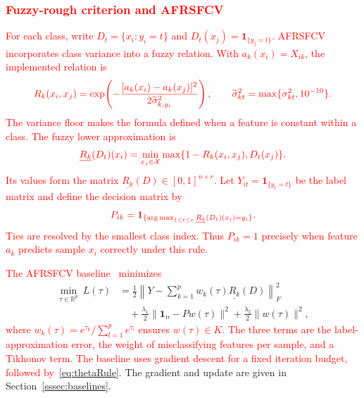\documentclass[]{interact}
\theoremstyle{plain}
\theoremstyle{definition}
\theoremstyle{remark}
\newcommand{\R}{\mathbb{R}}
\DeclareMathOperator*{\argmax}{arg\,max}
\begin{document}
\subsubsection{\textcolor{red}{Fuzzy-rough criterion and AFRSFCV}}\label{ssec:afrsfcv}\label{sssec:afrsfcv-inputs}\label{sssec:afrsfcv-model}
\leavevmode\textcolor{red}{For each class, write $D_t=\{x_i:y_i=t\}$ and $D_t(x_j)=\mathbf1_{\{y_j=t\}}$. AFRSFCV incorporates class variance into a fuzzy relation. With $a_k(x_i)=X_{ik}$, the implemented relation is}
\begin{equation}\label{eq:simRel}\textcolor{red}{
R_k(x_i,x_j)=\exp\!\left(-\frac{[a_k(x_i)-a_k(x_j)]^2}{2\widetilde\sigma_{k,y_i}^2}\right),
\qquad \widetilde\sigma_{kt}^2=\max\{\sigma_{kt}^2,10^{-10}\}.
}\end{equation}
\leavevmode\textcolor{red}{The variance floor makes the formula defined when a feature is constant within a class. The fuzzy lower approximation is}
\begin{equation}\label{eq:lower}\textcolor{red}{
\underline{R_k}(D_t)(x_i)=\min_{x_j\in\mathcal{X}}\max\{1-R_k(x_i,x_j),D_t(x_j)\}.
}\end{equation}
\leavevmode\textcolor{red}{Its values form the matrix $\underline{R_k}(D)\in[0,1]^{n\times r}$. Let $Y_{it}=\mathbf1_{\{y_i=t\}}$ be the label matrix and define the decision matrix by}
\begin{equation}\label{eq:Pmat}\textcolor{red}{
P_{ik}=\mathbf1_{\{\argmax_{1\le t\le r}\underline{R_k}(D_t)(x_i)=y_i\}}.
}\end{equation}
\leavevmode\textcolor{red}{Ties are resolved by the smallest class index. Thus $P_{ik}=1$ precisely when feature $a_k$ predicts sample $x_i$ correctly under this rule.}

\leavevmode\textcolor{red}{The AFRSFCV baseline~\citep{wang2026afrsfcv} minimizes}
\begin{equation}\label{eq:afrsfcvLoss}
\begin{split}
\min_{\tau\in\R^p}\ L(\tau)
&=\frac12\left\|Y-\sum_{k=1}^{p}w_k(\tau)\underline{R_k}(D)\right\|_F^2\\
&\quad+\frac{\lambda_1}{2}\|\mathbf1_n-Pw(\tau)\|^2+\frac{\lambda_2}{2}\|w(\tau)\|^2,
\end{split}
\end{equation}
\leavevmode\textcolor{red}{where $w_k(\tau)=e^{\tau_k}/\sum_{l=1}^{p}e^{\tau_l}$ ensures $w(\tau)\in K$. The three terms are the label-approximation error, the weight of misclassifying features per sample, and a Tikhonov term. The baseline uses gradient descent for a fixed iteration budget, followed by~\eqref{eq:thetaRule}}. The gradient and update are given in Section~\ref{sssec:baselines}.
\end{document}
